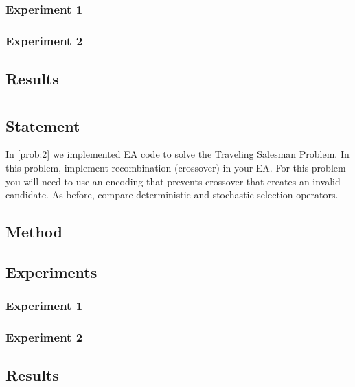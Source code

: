 \documentclass{article}
\begin{document}
\subsubsection{Experiment 1}
\subsubsection{Experiment 2}

\subsection{Results}

\section{}\label{prob:3}
\subsection{Statement}
In \autoref{prob:2} we implemented EA code to solve the Traveling Salesman Problem. In this
problem, implement recombination (crossover) in your EA. For this problem you will need to use an
encoding that prevents crossover that creates an invalid candidate. As before, compare
deterministic and stochastic selection operators.

\subsection{Method}

\subsection{Experiments}

\subsubsection{Experiment 1}
\subsubsection{Experiment 2}

\subsection{Results}
\end{document}
